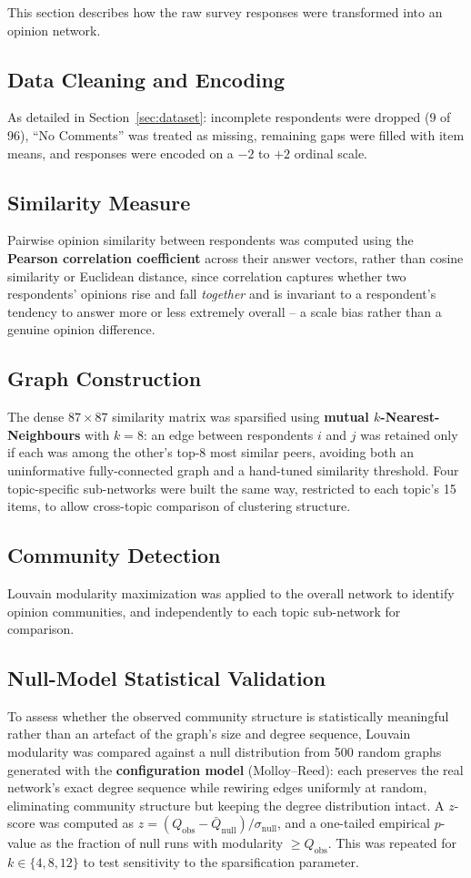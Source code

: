 \documentclass[11pt]{article}
\begin{document}
This section describes how the raw survey responses were transformed into an opinion
network.

\subsection{Data Cleaning and Encoding}
As detailed in Section~\ref{sec:dataset}: incomplete respondents were dropped (9 of
96), ``No Comments'' was treated as missing, remaining gaps were filled with item
means, and responses were encoded on a $-2$ to $+2$ ordinal scale.

\subsection{Similarity Measure}
Pairwise opinion similarity between respondents was computed using the \textbf{Pearson
correlation coefficient} across their answer vectors, rather than cosine similarity or
Euclidean distance, since correlation captures whether two respondents' opinions rise
and fall \emph{together} and is invariant to a respondent's tendency to answer more or
less extremely overall -- a scale bias rather than a genuine opinion difference.

\subsection{Graph Construction}
The dense $87 \times 87$ similarity matrix was sparsified using \textbf{mutual
$k$-Nearest-Neighbours} with $k=8$: an edge between respondents $i$ and $j$ was
retained only if each was among the other's top-8 most similar peers, avoiding both an
uninformative fully-connected graph and a hand-tuned similarity threshold. Four
topic-specific sub-networks were built the same way, restricted to each topic's 15
items, to allow cross-topic comparison of clustering structure.

\subsection{Community Detection}
Louvain modularity maximization was applied to the overall network to identify opinion
communities, and independently to each topic sub-network for comparison.

\subsection{Null-Model Statistical Validation}
To assess whether the observed community structure is statistically meaningful rather
than an artefact of the graph's size and degree sequence, Louvain modularity was
compared against a null distribution from 500 random graphs generated with the
\textbf{configuration model} (Molloy--Reed): each preserves the real network's exact
degree sequence while rewiring edges uniformly at random, eliminating community
structure but keeping the degree distribution intact. A $z$-score was computed as
$z = (Q_{\text{obs}} - \bar{Q}_{\text{null}})/\sigma_{\text{null}}$, and a one-tailed
empirical $p$-value as the fraction of null runs with modularity $\geq Q_{\text{obs}}$.
This was repeated for $k \in \{4, 8, 12\}$ to test sensitivity to the sparsification
parameter.
\end{document}
